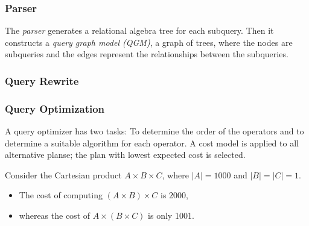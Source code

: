 \subsubsection{Parser}

The \emph{parser} generates a relational algebra tree for each subquery. Then it constructs a \emph{query graph model (QGM)}, a graph of trees, where the nodes are subqueries and the edges represent the relationships between the subqueries.




\subsubsection{Query Rewrite}




\subsubsection{Query Optimization}

A query optimizer has two tasks: To determine the order of the operators and to determine a suitable algorithm for each operator. A cost model is applied to all alternative planse; the plan with lowest expected cost is selected.

\begin{example}
Consider the Cartesian product $A \times B \times C$, where $\lvert A \rvert = 1000$ and $\lvert B \rvert = \lvert C \rvert = 1$.
\begin{itemize}
\item The cost of computing $(A \times B) \times C$ is $2000$,
\item whereas the cost of $A \times (B \times C)$ is only 1001.
\end{itemize}
\end{example}




